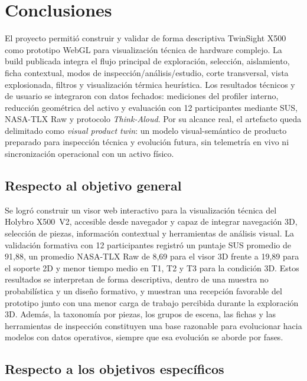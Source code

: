 \section{Conclusiones}

El proyecto permitió construir y validar de forma descriptiva TwinSight X500 como prototipo WebGL para visualización técnica de hardware complejo. La build publicada integra el flujo principal de exploración, selección, aislamiento, ficha contextual, modos de inspección/análisis/estudio, corte transversal, vista explosionada, filtros y visualización térmica heurística. Los resultados técnicos y de usuario se integraron con datos fechados: mediciones del profiler interno, reducción geométrica del activo y evaluación con 12 participantes mediante SUS, NASA-TLX Raw y protocolo \textit{Think-Aloud}. Por su alcance real, el artefacto queda delimitado como \textit{visual product twin}: un modelo visual-semántico de producto preparado para inspección técnica y evolución futura, sin telemetría en vivo ni sincronización operacional con un activo físico.

\subsection{Respecto al objetivo general}

Se logró construir un visor web interactivo para la visualización técnica del Holybro X500~V2, accesible desde navegador y capaz de integrar navegación 3D, selección de piezas, información contextual y herramientas de análisis visual. La validación formativa con 12 participantes registró un puntaje SUS promedio de 91,88, un promedio NASA-TLX Raw de 8,69 para el visor 3D frente a 19,89 para el soporte 2D y menor tiempo medio en T1, T2 y T3 para la condición 3D. Estos resultados se interpretan de forma descriptiva, dentro de una muestra no probabilística y un diseño formativo, y muestran una recepción favorable del prototipo junto con una menor carga de trabajo percibida durante la exploración 3D. Además, la taxonomía por piezas, los grupos de escena, las fichas y las herramientas de inspección constituyen una base razonable para evolucionar hacia modelos con datos operativos, siempre que esa evolución se aborde por fases.

\subsection{Respecto a los objetivos específicos}

